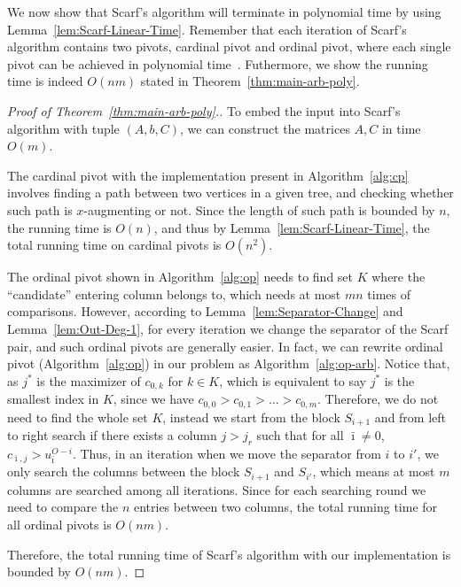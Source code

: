 \documentclass[11pt]{article}
\begin{document}
We now show that Scarf's algorithm will terminate in polynomial time by using Lemma~\ref{lem:Scarf-Linear-Time}. Remember that each iteration of Scarf's algorithm contains two pivots, cardinal pivot and ordinal pivot, where each single pivot can be achieved in polynomial time~\cite{scarf1967core}. Futhermore, we show the running time is indeed $O(nm)$ stated in Theorem~\ref{thm:main-arb-poly}.
\begin{proof}[Proof of Theorem~\ref{thm:main-arb-poly}.] 
    To embed the input into Scarf's algorithm with tuple $(A,b,C)$, we can construct the matrices $A,C$ in time $O(m)$. 

    The cardinal pivot with the implementation present in Algorithm~\ref{alg:cp} involves finding a path between two vertices in a given tree, and checking whether such path is $x$-augmenting or not. Since the length of such path is bounded by $n$, the running time is $O(n)$, and thus by Lemma~\ref{lem:Scarf-Linear-Time}, the total running time on cardinal pivots is $O(n^2)$.




    The ordinal pivot shown in Algorithm~\ref{alg:op} needs to find set $K$ where the ``candidate'' entering column belongs to, which needs at most $mn$ times of comparisons. However, according to Lemma~\ref{lem:Separator-Change} and Lemma~\ref{lem:Out-Deg-1}, for every iteration we change the separator of the Scarf pair, and such ordinal pivots are generally easier. In fact, we can rewrite ordinal pivot (Algorithm~\ref{alg:op}) in our problem as Algorithm~\ref{alg:op-arb}. Notice that, as $j^*$ is the maximizer of $c_{0,k}$ for $k\in K$, which is equivalent to say $j^*$ is the smallest index in $K$, since we have $c_{0,0}>c_{0,1}>\dots>c_{0,m}$. Therefore, we do not need to find the whole set $K$, instead we start from the block $S_{i+1}$ and from left to right search if there exists a column $j>j_r$ such that for all $\bar{\imath}\neq 0$, $c_{\bar{\imath},j}>u_{\bar{\imath}}^{O-i}$. Thus, in an iteration when we move the separator from $i$ to $i'$, we only search the columns between the block $S_{i+1}$ and $S_{i'}$, which means at most $m$ columns are searched among all iterations. Since for each searching round we need to compare the $n$ entries between two columns, the total running time for all ordinal pivots is $O(nm)$. 

    Therefore, the total running time of Scarf's algorithm with our implementation is bounded by $O(nm)$.
\end{proof}
\end{document}
